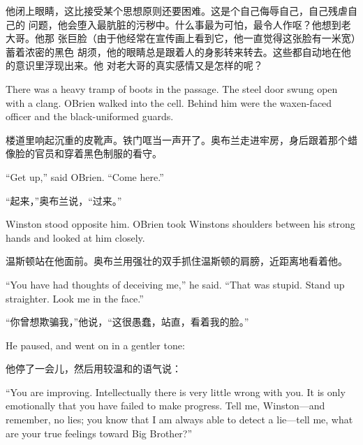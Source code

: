 \begin{paracol}{2}
\switchcolumn

他闭上眼睛，这比接受某个思想原则还要困难。这是个自己侮辱自己，自己残虐自己的
问题，他会堕入最肮脏的污秽中。什么事最为可怕，最令人作呕？他想到老大哥。他那
张巨脸（由于他经常在宣传画上看到它，他一直觉得这张脸有一米宽）蓄着浓密的黑色
胡须，他的眼睛总是跟着人的身影转来转去。这些都自动地在他的意识里浮现出来。他
对老大哥的真实感情又是怎样的呢？

\switchcolumn*

There was a heavy tramp of boots in the passage. The steel door swung
open with a clang. O\textquotesingle Brien walked into the cell. Behind
him were the waxen-faced officer and the black-uniformed guards.

\switchcolumn

楼道里响起沉重的皮靴声。铁门哐当一声开了。奥布兰走进牢房，身后跟着那个蜡像脸的官员和穿着黑色制服的看守。

\switchcolumn*

``Get up,'' said O\textquotesingle Brien. ``Come here.''

\switchcolumn

``起来，''奥布兰说，``过来。''

\switchcolumn*

Winston stood opposite him. O\textquotesingle Brien took
Winston\textquotesingle s shoulders between his strong hands and looked
at him closely.

\switchcolumn

温斯顿站在他面前。奥布兰用强壮的双手抓住温斯顿的肩膀，近距离地看着他。

\switchcolumn*

``You have had thoughts of deceiving me,'' he said. ``That was stupid.
Stand up straighter. Look me in the face.''

\switchcolumn

``你曾想欺骗我，''他说，``这很愚蠢，站直，看着我的脸。''

\switchcolumn*

He paused, and went on in a gentler tone:

\switchcolumn

他停了一会儿，然后用较温和的语气说：

\switchcolumn*

``You are improving. Intellectually there is very little wrong with you.
It is only emotionally that you have failed to make progress. Tell me,
Winston---and remember, no lies; you know that I am always able to
detect a lie---tell me, what are your true feelings toward Big Brother?''


\end{paracol}
